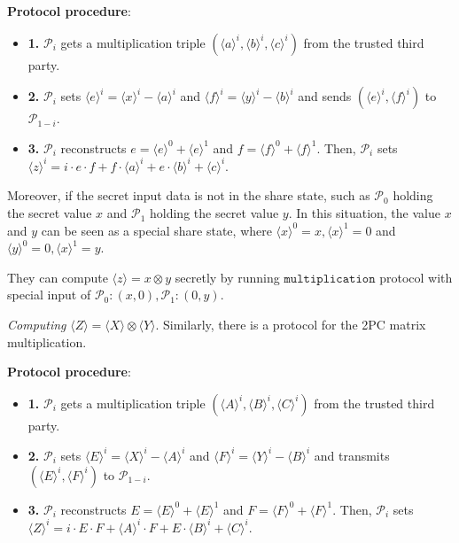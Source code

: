 \documentclass[letterpaper]{article} %
\begin{document}
    \textbf{Protocol procedure}:
    \begin{itemize}
        \item \textbf{1.} $\mathcal{P}_{i}$ gets a multiplication triple 
        $(\langle a\rangle ^{i},\langle b\rangle ^{i},\langle c\rangle ^{i})$ from the trusted third party.
        \item \textbf{2.} $\mathcal{P}_{i}$ sets $\langle e\rangle ^{i}=\langle x\rangle ^{i}-\langle a\rangle ^{i}$ and $\langle f\rangle ^{i}=\langle y\rangle ^{i}-\langle b\rangle ^{i}$
        and sends $(\langle e\rangle ^{i},\langle f\rangle ^{i})$ to $\mathcal{P}_{1-i}$.
        \item \textbf{3.} $\mathcal{P}_{i}$ reconstructs $e = \langle e\rangle ^{0}+\langle e\rangle ^{1}$ and $f = \langle f\rangle ^{0}+\langle f\rangle ^{1}$. 
        Then, $\mathcal{P}_{i}$ sets $\langle z\rangle^{i}=i\cdot e \cdot f + f\cdot \langle a\rangle^{i}+e \cdot \langle b\rangle^{i} + \langle c\rangle^{i}$.
    
    \end{itemize}
    
    Moreover, if the secret input data is not in the share state,
    such as $\mathcal{P}_{0}$ holding the secret value $x$
    and $\mathcal{P}_{1}$ holding the secret value $y$.
    In this situation, the value $x$ and $y$ can be
    seen as a special share state, where
    $\langle x\rangle ^{0}=x,\langle x\rangle ^{1}=0$ and 
    $\langle y\rangle ^{0}=0,\langle x\rangle ^{1}=y$.

    They can compute $\langle z\rangle=x\otimes y$ secretly
    by running $\mathtt{multiplication}$ protocol with special input of 
    $\mathcal{P}_{0}:(x,0),\mathcal{P}_{1}:(0,y)$.
   
    \emph{Computing} $ \langle Z\rangle  = \langle X\rangle  \otimes \langle Y\rangle$.
    Similarly, there is a protocol for the 2PC matrix multiplication.

    \textbf{Protocol procedure}:
    \begin{itemize}
        \item \textbf{1.} $\mathcal{P}_{i}$ gets a multiplication triple 
        $(\langle A\rangle ^{i},\langle B\rangle ^{i},\langle C\rangle ^{i})$ from the trusted third party.
        \item \textbf{2.} $\mathcal{P}_{i}$ sets $\langle E\rangle ^{i}=\langle X\rangle ^{i}-\langle A\rangle ^{i}$ and $\langle F\rangle ^{i}=\langle Y\rangle ^{i}-\langle B\rangle ^{i}$
        and transmits $(\langle E\rangle ^{i},\langle F\rangle ^{i})$ to $\mathcal{P}_{1-i}$.
        \item \textbf{3.} $\mathcal{P}_{i}$ reconstructs $E = \langle E\rangle ^{0}+\langle E\rangle ^{1}$ and $F = \langle F\rangle ^{0}+\langle F\rangle ^{1}$. 
        Then, $\mathcal{P}_{i}$ sets $\langle Z\rangle^{i}=i\cdot E \cdot F + \langle A\rangle^{i} \cdot F + E \cdot \langle B\rangle^{i} + \langle C\rangle^{i}$.
    
    \end{itemize}
    
\end{document}
